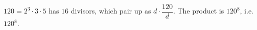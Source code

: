 $120=2^3\cdot3\cdot5$ has $16$ divisors, which pair up as $d\cdot\dfrac{120}d$. The product is $120^8$, i.e. $\boxed{120^{8}}$.
